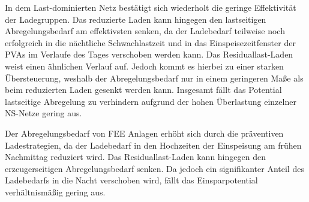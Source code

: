 In dem Last-dominierten Netz bestätigt sich wiederholt die geringe Effektivität der Ladegruppen.
Das reduzierte Laden kann hingegen den lastseitigen Abregelungsbedarf am effektivsten senken, da der Ladebedarf teilweise noch erfolgreich in die nächtliche Schwachlastzeit und in das Einspeisezeitfenster der \glspl{PVA} im Verlaufe des Tages verschoben werden kann.
Das Residuallast-Laden weist einen ähnlichen Verlauf auf.
Jedoch kommt es hierbei zu einer starken Übersteuerung, weshalb der Abregelungsbedarf nur in einem geringeren Maße als beim reduzierten Laden gesenkt werden kann.
Insgesamt fällt das Potential lastseitige Abregelung zu verhindern aufgrund der hohen Überlastung einzelner \gls{NS}-Netze gering aus.\medskip

Der Abregelungsbedarf von \gls{FEE} Anlagen erhöht sich durch die präventiven Ladestrategien, da der Ladebedarf in den Hochzeiten der Einspeisung am frühen Nachmittag reduziert wird.
Das Residuallast-Laden kann hingegen den erzeugerseitigen Abregelungsbedarf senken.
Da jedoch ein signifikanter Anteil des Ladebedarfs \zH in die Nacht verschoben wird, fällt das Einsparpotential verhältnismäßig gering aus.

\clearpage
